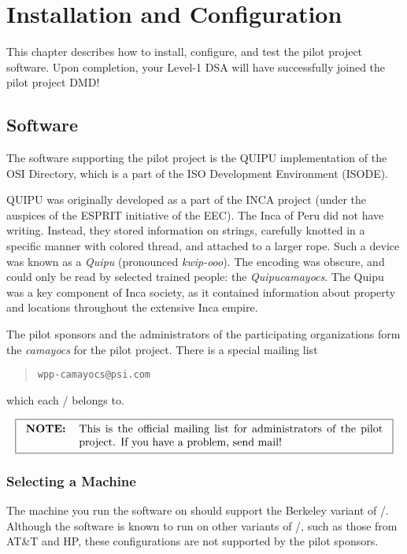 
\chapter	{Installation and Configuration}\label{installation}
This chapter describes how to install, configure, and test the pilot project
software.
Upon completion,
your Level-1 DSA will have successfully joined the pilot project DMD!

\section	{Software}
The software supporting the pilot project is the QUIPU implementation
of the OSI Directory,
which is a part of the ISO Development Environment (ISODE).

QUIPU was originally developed as a part of the INCA project
(under the auspices of the ESPRIT initiative of the EEC).
The Inca of Peru did not have writing.
Instead,
they stored information on strings,
carefully knotted in a specific manner with colored thread,
and attached to a larger rope.
Such a device was known as a {\em Quipu\/}
(pronounced {\em kwip-ooo}).
The encoding was obscure,
and could only be read by selected trained people:
the {\em Quipucamayocs}.
The Quipu was a key component of Inca society,
as it contained information about property and locations throughout
the extensive Inca empire.

The pilot sponsors and the administrators of the participating organizations
form the {\em camayocs\/} for the pilot project.
There is a special mailing list
\begin{quote}\small\begin{verbatim}
wpp-camayocs@psi.com
\end{verbatim}\end{quote}
which each \camayoc/ belongs to.

\[\fbox{\begin{tabular}{lp{0.8\textwidth}}
\bf NOTE:&	This is the official mailing list for administrators of the
		pilot project.
		If you have a problem, send mail!
\end{tabular}}\]

\subsection	{Selecting a Machine}
The machine you run the software on should support the Berkeley variant of
\unix/.
Although the software is known to run on other variants of \unix/, such as
those from AT\&T and HP,
these configurations are not supported by the pilot sponsors.


